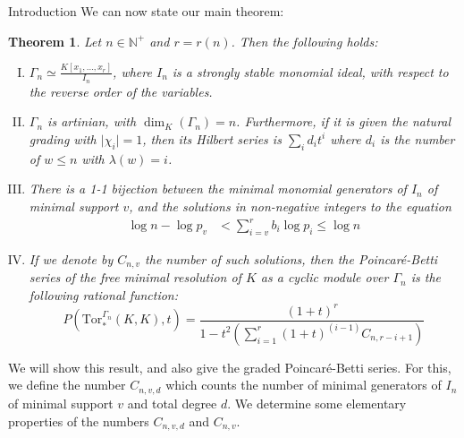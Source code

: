 \documentclass[reqno,10pt]{amsart}
\newcommand{\Tor}{\mathrm{Tor}}
\theoremstyle{definition}
\theoremstyle{remark}
\theoremstyle{plain}
\newtheorem{thm}[definition]{Theorem}
\newcommand{\Nat}{{\mathbb{N}}}
\newcommand{\tdeg}[1]{\vert#1\rvert}
\begin{document}
\begin{section}{Introduction}
  We can now state our main theorem:
  \begin{thm}\label{thm:main}
    Let \(n \in \Nat^+\) and \(r=r(n)\). Then the following holds:
    \begin{enumerate}[(I)]
    \item \label{enum:monquotient}    
      \(\Gamma_n \simeq \frac{K[x_1,\dots,x_r]}{I_n}\), where 
      \(I_n\) is  a strongly stable monomial ideal, with respect to the
      reverse order of the variables. 
    \item \label{enum:hilbert}    
      \(\Gamma_n\) is artinian, with
      \(\dim_K(\Gamma_n)=n\). Furthermore, if it is given the natural
      grading with \(\tdeg{\chi_i}=1\), then its Hilbert series is
     \(\sum_{i} d_{i} t^i\)
    where \(d_i\) is the number of \(w \le n\)
    with \(\lambda(w) = i\).
    \item  \label{enum:oneone}    
      There is a 1-1
    bijection between the minimal monomial generators of \(I_n\) of
    minimal support \(v\), and
    the solutions in non-negative integers to the equation
    \begin{equation}
      \label{eqn:fcnvd}
      \begin{split}
      \log n - \log p_v & < \sum_{i=v}^r b_i \log p_i \le \log n 
      \end{split}
    \end{equation}
  \item \label{enum:PB}    
    If we denote by \(C_{n,v}\) the number of such solutions, then
    the Poincar\'e-Betti series of the free minimal resolution of
    \(K\) as a cyclic module over \(\Gamma_n\) is the following
    rational function:
    \begin{equation}
      \label{eq:pbser}
      P(\Tor_{*}^{\Gamma_n}(K,K),t) =    
      \frac{(1+t)^r}{1- t^2 \left(\sum_{i=1}^r
          (1+t)^{(i-1)}C_{n,r-i+1}\right)} 
    \end{equation}
    \end{enumerate}
  \end{thm}
  
  We will show this result, and also give the graded Poincar\'e-Betti
  series. 
  For this, we define the number \(C_{n,v,d}\) which counts the number
  of minimal generators of \(I_n\) of minimal support \(v\) and total
  degree \(d\). We determine some elementary properties of the numbers
  \(C_{n,v,d}\) and \(C_{n,v}\).
  

\end{section}
\end{document}

